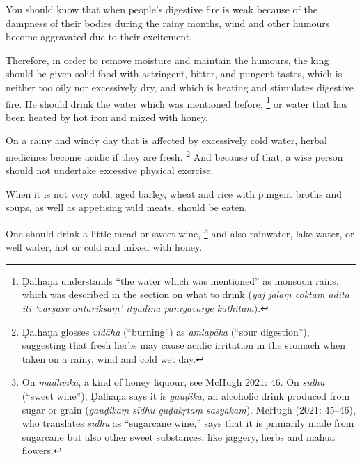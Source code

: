 \begin{translation}
\item [5] 
You should know that when people's digestive fire is weak because of the dampness of their bodies during the rainy months, wind and other humours become aggravated due to their excitement.

\item [6--8ab]
Therefore, in order to remove moisture and maintain the humours, the king should be given solid food with astringent, bitter, and pungent tastes, which is neither too oily nor excessively dry, and which is heating and stimulates digestive fire. He should drink the water which was mentioned before,%
        \footnote{Ḍalhaṇa\citep[809]{vulgate} understands “the water which was mentioned” as monsoon rains, which was described in the section on what to drink (\emph{yaj jalaṃ coktam ādita iti ‘varṣāsv antarikṣaṃ’ ityādinā pānīyavarge kathitam}).} %
or water that has been heated by hot iron and mixed with honey. 

\item [8cd--9]
On a rainy and windy day that is affected by excessively cold water,  herbal medicines become acidic if they are fresh.%
	\footnote{Ḍalhaṇa \citep[809]{vulgate}  glosses \emph{vidāha} (“burning”) as \emph{amlapāka} (“sour digestion”), suggesting that fresh herbs may cause acidic irritation in the stomach when taken on a rainy, wind and cold wet day.}
And because of that, a wise person should not undertake excessive physical exercise.

\item [10] %
When it is not very cold, aged barley, wheat and rice with pungent broths and soups, as well as appetising wild meats, should be eaten. 

\item [11] %
One should drink a little mead or sweet wine, %
	\footnote{On \emph{mādhvīka}, a kind of honey liquour, see McHugh 2021: 46. On \emph{sīdhu} (“sweet wine”), Ḍalhaṇa \citep[778]{vulgate} says it is \emph{gauḍika}, an alcoholic drink produced from sugar or grain (\emph{gauḍikaṃ sīdhu guḍakṛtaṃ sasyakam}). McHugh (2021: 45–46), who translates \emph{sīdhu} as “sugarcane wine,” says that it is primarily made from sugarcane but also other sweet substances, like jaggery, herbs and mahua flowers.}
%
and also rainwater, lake water, or well water, hot or cold and mixed with honey. 


\end{translation}
